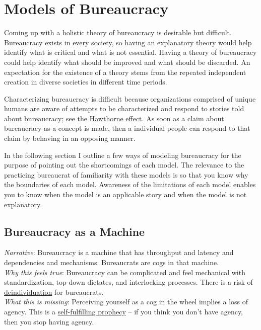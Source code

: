 \section{Models of Bureaucracy}

Coming up with a holistic theory of bureaucracy is desirable but difficult. Bureaucracy exists in every society, so having an explanatory theory would help identify what is critical and what is not essential. Having a theory of bureaucracy could help identify what should be improved and what should be discarded. An expectation for the existence of a theory stems from the repeated independent creation in diverse societies in different time periods. 

Characterizing bureaucracy is difficult because organizations comprised of unique humans are aware of attempts to be characterized and respond to stories told about bureaucracy; see the \href{https://en.wikipedia.org/wiki/Hawthorne_effect}{Hawthorne effect}. As soon as a claim about bureaucracy-as-a-concept is made, then a individual people can respond to that claim by behaving in an opposing manner. 

In the following section I outline a few ways of modeling bureaucracy for the purpose of pointing out the shortcomings of each model. The relevance to the practicing bureaucrat of familiarity with these models is so that you know why the boundaries of each model. Awareness of the limitations of each model enables you to know when the model is an applicable story and when the model is not explanatory. 

\subsection{Bureaucracy as a Machine}

\textit{Narrative}: Bureaucracy is a machine that has throughput and latency and dependencies and mechanisms. Bureaucrats are cogs in that machine.\\
\textit{Why this feels true}: Bureaucracy can be complicated and feel mechanical with standardization, top-down dictates, and interlocking processes. There is a risk of \href{https://en.wikipedia.org/wiki/Deindividuation}{deindividuation} for bureaucrats. \\
\textit{What this is missing}: Perceiving yourself as a cog in the wheel implies a loss of agency. This is a \href{https://en.wikipedia.org/wiki/Self-fulfilling_prophecy}{self-fulfilling prophecy} -- if you think you don't have agency, then you stop having agency. 

